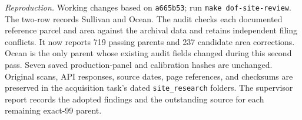 \textit{Reproduction.} Working changes based on \texttt{a665b53}; run
\texttt{make dof-site-review}. The two-row
 records Sullivan and Ocean. The audit
checks each documented reference parcel and area against the archival data and
retains independent filing conflicts. It now reports 719 passing parents and
237 candidate area corrections. Ocean is the only parent whose existing audit
fields changed during this second pass. Seven saved production-panel and
calibration hashes are unchanged. Original scans, API responses, source dates,
page references, and checksums are preserved in the acquisition task's dated
\texttt{site\_research} folders. The supervisor report records the adopted
findings and the outstanding source for each remaining exact-99 parent.
